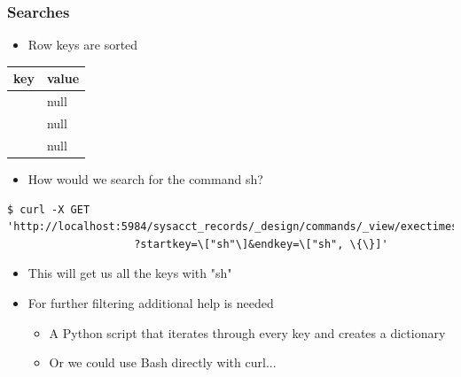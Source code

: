 \documentclass{beamer}
\begin{document}
\begin{frame}[t, fragile]
\frametitle{Searches}
\begin{itemize}
\item Row keys are sorted
\end{itemize}
{ \tiny
\begin{center}
\begin{tabular}{|l|l|}
	\hline
	\textbf{key} & \textbf{value} \\
	\hline
	\hline
	["sendmail", "ssmp", "spock.cern.ch", "1333333333"] & null \\
	\hline
	["sh", "root", "kirk.cern.ch", "1333333334"] & null \\
	\hline
	["sh", "root", "spock.cern.ch", "1333333335"] & null \\
	\hline
\end{tabular}
\end{center}
}
\begin{itemize}
 \item How would we search for the command sh?
\end{itemize}

{ \tiny
\begin{center}
\begin{verbatim}
$ curl -X GET 'http://localhost:5984/sysacct_records/_design/commands/_view/exectimes
					?startkey=\["sh"\]&endkey=\["sh", \{\}]'
\end{verbatim}
\end{center}
}
\begin{itemize}

\item This will get us all the keys with "sh"
\item For further filtering additional help is needed

\begin{itemize}
	\item A Python script that iterates through every key and creates a dictionary
	\item Or we could use Bash directly with curl...
\end{itemize}
\end{itemize}
\end{frame}
\end{document}

